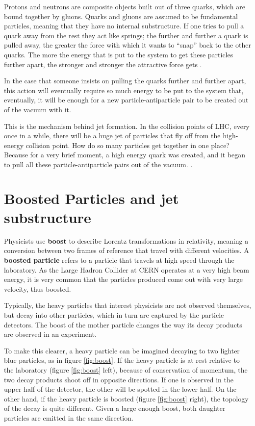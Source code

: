 Protons and neutrons are composite objects built out of three quarks, which are bound together by gluons. Quarks and gluons are assumed to be fundamental particles, meaning that they have no internal substructure. If one tries to pull a quark away from the rest they act like springs; the further and further a quark is pulled away, the greater the force with which it wants to “snap” back to the other quarks. The more the energy that is put to the system to get these particles further apart, the stronger and stronger the attractive force gets \cite{TheLHCmadesimplefreequarks,jetalltheway}.

In the case that someone insists on pulling the quarks further and further apart, this action will eventually require so much energy to be put to the system that, eventually, it will be enough for a new particle-antiparticle pair to be created out of the vacuum with it.%

This is the mechanism behind jet formation. In the collision points of LHC, every once in a while, there will be a huge jet of particles that fly off from the high-energy collision point. How do so many particles get together in one place? Because for a very brief moment, a high energy quark was created, and it began to pull all these particle-antiparticle pairs out of the vacuum. \cite{TheLHCmadesimplefreequarks,jets}.


\section{Boosted Particles and jet substructure}\label{ch:fatjet}

Physicists use \textbf{boost} to describe Lorentz transformations in relativity, meaning a conversion between two frames of reference that travel with different velocities. A \textbf{boosted particle} refers to a particle that travels at high speed through the laboratory. As the Large Hadron Collider at CERN operates at a very high beam energy, it is very common that the particles produced come out with very large velocity, thus boosted.

Typically, the heavy particles that interest physicists are not observed themselves, but decay into other particles, which in turn are captured by the particle detectors. The boost of the mother particle changes the way its decay products are observed in an experiment. 

To make this clearer, a heavy particle can be imagined decaying to two lighter blue particles, as in figure \ref{fig:boost}. If the heavy particle is at rest relative to the laboratory (figure \ref{fig:boost} left), because of conservation of momentum, the two decay products shoot off in opposite directions. If one is observed in the upper half of the detector, the other will be spotted in the lower half. On the other hand, if the heavy particle is boosted (figure \ref{fig:boost} right), the topology of the decay is quite different. Given a large enough boost, both daughter particles are emitted in the same direction. 

